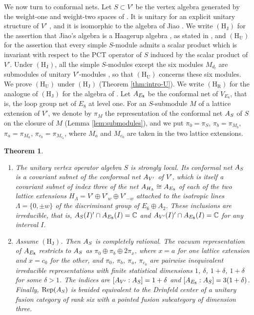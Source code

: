 \documentclass[leqno]{article}
\newcommand{\Cbb}{\ensuremath{\mathbb{C}}}
\let\cal\relax
\newcommand{\cal}{\mathcal}
\DeclareMathOperator{\Rep}{Rep} %
\newtheorem{thm}{Theorem}[section]
\numberwithin{equation}{section}
\begin{document}
We now turn to conformal nets. Let $S \subset V'$ be the vertex algebra generated by the weight-one and weight-two spaces of \cite[Theorem 1.3]{Arh26}. It is unitary for an explicit unitary structure of $V'$ \cite[Theorem 10.10]{Arh26}, and it is isomorphic to the algebra of Jiao \cite[Theorem 10.24]{Arh26}. We write $\mathrm{(H_J)}$ for the assertion that Jiao's algebra is a Haagerup algebra \cite[Section 1]{Arh26}, as stated in \cite{Jia26}, and $\mathrm{(H_U)}$ for the assertion that every simple $S$-module admits a scalar product which is invariant with respect to the PCT operator of $S$ induced by the scalar product of $V'$. Under $\mathrm{(H_J)}$, all the simple $S$-modules except the six modules $M_{d_l}$ are submodules of unitary $V'$-modules \cite[Proposition 4.1, Lemma 4.3 and Lemma 11.8]{Arh26}, so that $\mathrm{(H_U)}$ concerns these six modules. We prove $\mathrm{(H_U)}$ under $\mathrm{(H_J)}$ (Theorem \ref{thm:intro-U}). We write $\mathrm{(H_R)}$ for the analogue of $\mathrm{(H_J)}$ for the algebra of \cite{Rie26}. Let $\cal A_{E_8}$ be the conformal net of $V_{E_8}$, that is, the loop group net of $E_8$ at level one. For an $S$-submodule $M$ of a lattice extension of $V'$, we denote by $\pi_M$ the representation of the conformal net $\cal A_S$ of $S$ on the closure of $M$ (Lemma \ref{lem:submodules}), and we put $\pi_0 = \pi_S$, $\pi_b = \pi_{M_b}$, $\pi_a = \pi_{M_a}$, $\pi_{c_0} = \pi_{M_{c_0}}$, where $M_a$ and $M_{c_0}$ are taken in the two lattice extensions.

\begin{thm}
\label{thm:intro-B}
\begin{enumerate}
\item The unitary vertex operator algebra $S$ is strongly local. Its conformal net $\cal A_S$ is a covariant subnet of the conformal net $\cal A_{V'}$ of $V'$, which is itself a covariant subnet of index three of the net $\cal A_{H_\Lambda} \cong \cal A_{E_8}$ of each of the two lattice extensions $H_\Lambda = V' \oplus V'_w \oplus V'_{-w}$ attached to the isotropic lines $\Lambda = \{0,\pm w\}$ of the discriminant group of $E_6 \oplus A_2$. These inclusions are irreducible, that is, $\cal A_S(I)' \cap \cal A_{E_8}(I) = \Cbb$ and $\cal A_{V'}(I)' \cap \cal A_{E_8}(I) = \Cbb$ for any interval $I$.
\item Assume $\mathrm{(H_J)}$. Then $\cal A_S$ is completely rational. The vacuum representation of $\cal A_{E_8}$ restricts to $\cal A_S$ as $\pi_0 \oplus \pi_b \oplus 2\pi_x$, where $x = a$ for one lattice extension and $x = c_0$ for the other, and $\pi_0$, $\pi_b$, $\pi_a$, $\pi_{c_0}$ are pairwise inequivalent irreducible representations with finite statistical dimensions $1$, $\delta$, $1+\delta$, $1+\delta$ for some $\delta > 1$. The indices are $[\cal A_{V'} : \cal A_S] = 1+\delta$ and $[\cal A_{E_8} : \cal A_S] = 3(1+\delta)$. Finally, $\Rep(\cal A_S)$ is braided equivalent to the Drinfeld center of a unitary fusion category of rank six with a pointed fusion subcategory of dimension three.
\end{enumerate}
\end{thm}
\end{document}
